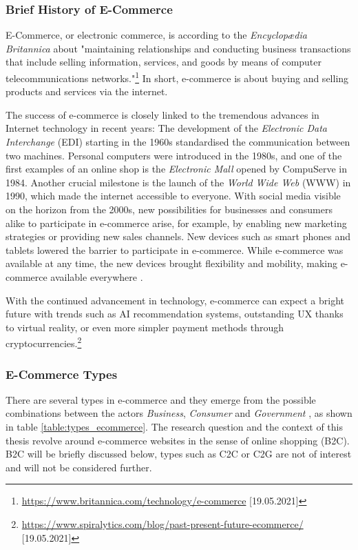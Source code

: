 \subsubsection{Brief History of E-Commerce} %

E-Commerce, or electronic commerce, is according to the \textit{Encyclopædia Britannica} about "maintaining relationships and conducting business transactions that include selling information, services, and goods by means of computer telecommunications networks."\footnote{\url{https://www.britannica.com/technology/e-commerce} [19.05.2021]}
In short, e-commerce is about buying and selling products and services via the internet.

The success of e-commerce is closely linked to the tremendous advances in Internet technology in recent years:
The development of the \textit{Electronic Data Interchange} (EDI) starting in the 1960s standardised the communication between two machines.
Personal computers were introduced in the 1980s, and one of the first examples of an online shop is the \textit{Electronic Mall} opened by CompuServe in 1984.
Another crucial milestone is the launch of the \textit{World Wide Web} (WWW) in 1990, which made the internet accessible to everyone.
With social media visible on the horizon from the 2000s, new possibilities for businesses and consumers alike to participate in e-commerce arise, for example, by enabling new marketing strategies or providing new sales channels.
New devices such as smart phones and tablets lowered the barrier to participate in e-commerce.
While e-commerce was available at any time, the new devices brought flexibility and mobility, making e-commerce available everywhere \cite{2019Hermogeno}.

With the continued advancement in technology, e-commerce can expect a bright future with trends such as AI recommendation systems, outstanding UX thanks to virtual reality, or even more simpler payment methods through cryptocurrencies.\footnote{\url{https://www.spiralytics.com/blog/past-present-future-ecommerce/} [19.05.2021]}


\subsubsection{E-Commerce Types} %

There are several types in e-commerce and they emerge from the possible combinations between the actors \textit{Business}, \textit{Consumer} and \textit{Government} \cite{2017DosSantos}, as shown in table \ref{table:types_ecommerce}.
The research question and the context of this thesis revolve around e-commerce websites in the sense of online shopping (B2C).
B2C will be briefly discussed below, types such as C2C or C2G are not of interest and will not be considered further.

